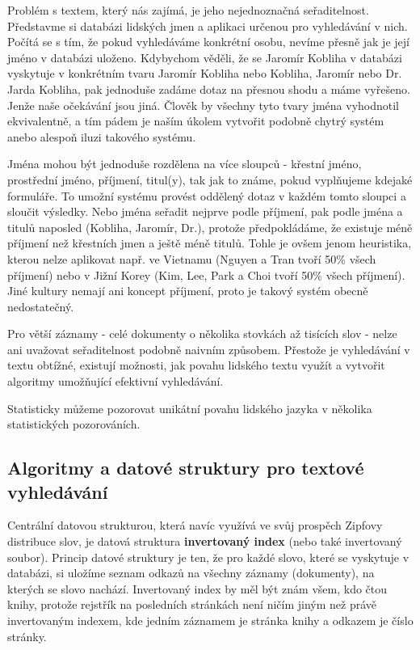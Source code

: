\documentclass[11pt]{article}
\begin{document}
Problém s textem, který nás zajímá, je jeho nejednoznačná seřaditelnost.
Představme si databázi lidských jmen a aplikaci určenou pro vyhledávání v nich.
Počítá se s tím, že pokud vyhledáváme konkrétní osobu, nevíme přesně jak je
její jméno v databázi uloženo. Kdybychom věděli, že se Jaromír Kobliha v
databázi vyskytuje v konkrétním tvaru Jaromír Kobliha nebo Kobliha, Jaromír
nebo Dr. Jarda Kobliha, pak jednoduše zadáme dotaz na přesnou shodu a máme
vyřešeno. Jenže naše očekávání jsou jiná. Člověk by všechny tyto tvary jména
vyhodnotil ekvivalentně, a tím pádem je naším úkolem vytvořit podobně chytrý
systém anebo alespoň iluzi takového systému. 

Jména mohou být jednoduše rozdělena na více sloupců - křestní jméno, prostřední
jméno, příjmení, titul(y), tak jak to známe, pokud vyplňujeme kdejaké
formuláře. To umožní systému provést oddělený dotaz v každém tomto sloupci a
sloučit výsledky. Nebo jména seřadit nejprve podle příjmení, pak podle jména a
titulů naposled (Kobliha, Jaromír, Dr.), protože předpokládáme, že existuje
méně příjmení než křestních jmen a ještě méně titulů. Tohle je ovšem jenom
heuristika, kterou nelze aplikovat např. ve Vietnamu (Nguyen a Tran tvoří 50\%
všech příjmení) nebo v Jižní Korey (Kim, Lee, Park a Choi tvoří 50\% všech
příjmení). Jiné kultury nemají ani koncept příjmení, proto je takový systém
obecně nedostatečný.

Pro větší záznamy - celé dokumenty o několika stovkách až tisících slov - nelze
ani uvažovat seřaditelnost podobně naivním způsobem. Přestože je vyhledávání v
textu obtížné, existují možnosti, jak povahu lidského textu využít a vytvořit
algoritmy umožňující efektivní vyhledávání.

Statisticky můžeme pozorovat unikátní povahu lidského jazyka v několika statistických pozorováních.


\subsection{Algoritmy a datové struktury pro textové vyhledávání}
Centrální datovou strukturou, která navíc využívá ve svůj prospěch Zipfovy
distribuce slov, je datová struktura \textbf{invertovaný index} (nebo také
invertovaný soubor). Princip datové struktury je ten, že pro každé slovo, které
se vyskytuje v databázi, si uložíme seznam odkazů na všechny záznamy
(dokumenty), na kterých se slovo nachází.  Invertovaný index by měl být znám
všem, kdo čtou knihy, protože rejstřík na posledních stránkách není ničím jiným
než právě invertovaným indexem, kde jedním záznamem je stránka knihy a odkazem
je číslo stránky. 
\end{document}
